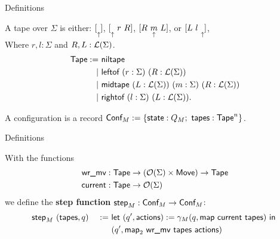 \begin{frame}{Definitions}
  \begin{definition}[Tape]
    A tape over $\Sigma$ is either:
    $ [ \underset{\uparrow}{} ]$, $[ \underset{\uparrow}{}~r~R ]$, $[ R~\underset{\uparrow}{m}~L ]$, or $[ L~l~\underset{\uparrow}{} ]$,\\
    Where $r,l : \Sigma$ and $R,L : \mathcal{L}(\Sigma)$.
    \pause%
    \begin{alignat*}{2}
      \textsf{Tape} := ~ & \textsf{niltape} \\
      | ~ & \textsf{leftof}  ~ (r:\Sigma) ~ (R:\mathcal{L}(\Sigma)) \\
      | ~ & \textsf{midtape} ~ (L:\mathcal{L}(\Sigma)) ~ (m:\Sigma) ~ (R:\mathcal{L}(\Sigma)) \\
      | ~ & \textsf{rightof} ~ (l:\Sigma) ~ (L:\mathcal{L}(\Sigma)).
    \end{alignat*}
  \end{definition}
  \pause%
  \begin{definition}[Configuration]
    A configuration is a record $\textsf{Conf}_M := \{\textsf{state}:Q_M;~ \textsf{tapes}:\textsf{Tape}^n\}$.
  \end{definition}
\end{frame}

\begin{frame}{Definitions}
  \begin{definition}
    With the functions
    \begin{alignat*}{2}
      \textsf{wr\_mv}  & : \textsf{Tape} \rightarrow (\mathcal{O}(\Sigma) \times \textsf{Move}) \rightarrow \textsf{Tape} \\
      \textsf{current} & : \textsf{Tape} \rightarrow \mathcal{O}(\Sigma)
    \end{alignat*}
    we define the \textbf{step function} $\textsf{step}_M : \textsf{Conf}_M \rightarrow \textsf{Conf}_M$:
    \begin{alignat*}{2}
      \textsf{step}_M &~(\textsf{tapes}, q) &~:=~& \textsf{let}~(q', \textsf{actions}) := \gamma_M(q, \textsf{map}~\textsf{current}~\textsf{tapes})~\textsf{in}~ \\
                  &                 &~  ~& (q', \textsf{map}_2~\textsf{wr\_mv}~\textsf{tapes}~\textsf{actions})
      \end{alignat*}
  \end{definition}
\end{frame}

